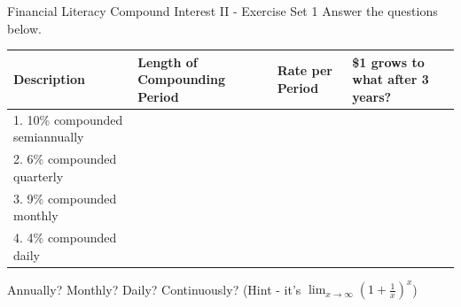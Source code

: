\documentclass[addpoints,twoside]{exam}         %
\begin{document}
\FontEasyRead                                   %

\Heading                                        %
{Financial Literacy}                            %
{Compound Interest II - Exercise Set 1}          %
{Answer the questions below.}


\renewcommand{\arraystretch}{2} %
\setlength{\tabcolsep}{10pt} %
\begin{table}[h]
    \centering
    \begin{tabular}{|p{3cm}<{\raggedright}|p{3cm}<{\raggedright}|p{2cm}<{\raggedright}|p{5cm}<{\raggedright}|}
        \hline
        \textbf{Description}            & \textbf{Length of Compounding Period} & \textbf{Rate per Period} & \textbf{\$1 grows to what after 3 years?} \\
        \hline
        1. 10\% compounded semiannually &                                       &                          &                                           \\
        \hline
        2. 6\% compounded quarterly     &                                       &                          &                                           \\
        \hline
        3. 9\% compounded monthly       &                                       &                          &                                           \\
        \hline
        4. 4\% compounded daily         &                                       &                          &                                           \\
        \hline
    \end{tabular}
\end{table}

\vspace{0.5cm}

\begin{questions}
    \setcounter{question}{4}   %
    \question Annually?
    \vspace{.7cm}
    \question Monthly?
    \vspace{.7cm}
    \question Daily?
    \vspace{.7cm}
    \question Continuously? (Hint - it's $\lim_{x \to \infty} (1+\frac{1}{x})^x$)
\end{questions}
\end{document}
